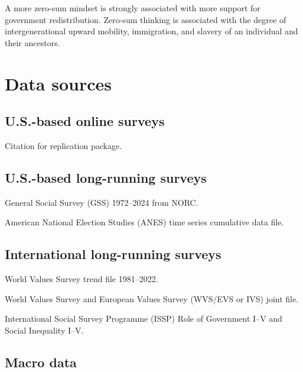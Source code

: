 \documentclass{article}
\newcommand{\citem}[1]{\medskip \noindent \textbf{\cite*{#1}}}
\begin{document}
\citem{chinoy2026zero}

A more zero-sum mindset is strongly associated with more support for government redistribution. Zero-sum thinking is associated with the degree of intergenerational upward mobility, immigration, and slavery of an individual and their ancestors.




\section{Data sources}

\subsection{U.S.-based online surveys} 

\citem{chinoy2026data}

Citation for replication package.

\citem{stantcheva2021data}

\citem{alesina2018data}

\subsection{U.S.-based long-running surveys} 

\citem{gss2024}

General Social Survey (GSS) 1972--2024 from NORC.

\citem{anes_cumulative}

American National Election Studies (ANES) time series cumulative data file.

\subsection{International long-running surveys} 

\citem{wvs_trend}

World Values Survey trend file 1981--2022.

\citem{evs_wvs_joint}

World Values Survey and European Values Survey (WVS/EVS or IVS) joint file.

\citem{issp_rog, issp_socineq}

International Social Survey Programme (ISSP) Role of Government I--V and Social Inequality I--V.

\subsection{Macro data}
\end{document}
